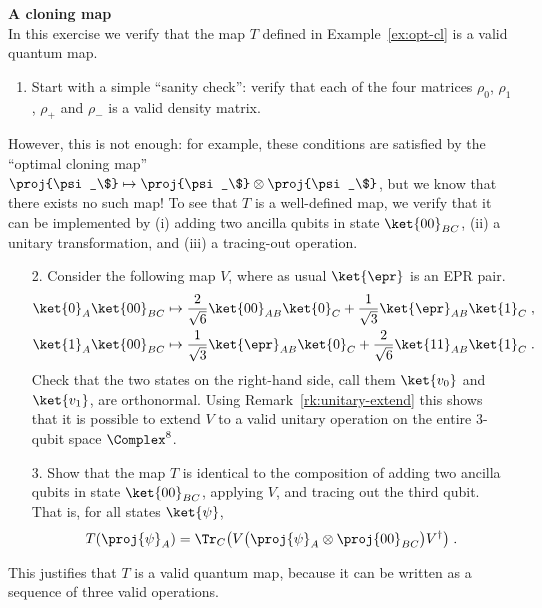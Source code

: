 \begin{exercises}
\item {\bf A cloning map}\label{ex:2-qmamp}\\
In this exercise we verify that the map $T$ defined in Example~\ref{ex:opt-cl} is a valid quantum map. 
\begin{enumerate}
\item Start with a simple ``sanity check'': verify that each of the four matrices $\rho_0$, $\rho_1$, $\rho_+$ and $\rho_-$ is a valid density matrix. 
\end{enumerate}
However, this is not enough: for example, these conditions are satisfied by the ``optimal cloning map'' $\proj{\psi_\$}\mapsto \proj{\psi_\$}\otimes \proj{\psi_\$}$, but we know that there exists no such map! To see that $T$ is a well-defined map, we verify that it can be implemented by (i) adding two ancilla qubits in state $\ket{00}_{BC}$, (ii) a unitary transformation, and (iii) a tracing-out operation. 
\begin{enumerate}
\item[2.] Consider the following map $V$, where as usual $\ket{\epr}$ is an EPR pair.  
\begin{align*}
\ket{0}_A \ket{00}_{BC} \mapsto \frac{2}{\sqrt{6}}\ket{00}_{AB}\ket{0}_C + \frac{1}{\sqrt{3}} \ket{\epr}_{AB} \ket{1}_C \;,\\
\ket{1}_A \ket{00}_{BC} \mapsto  \frac{1}{\sqrt{3}} \ket{\epr}_{AB}\ket{0}_C + \frac{2}{\sqrt{6}}\ket{11}_{AB}\ket{1}_C \;.
\end{align*}
Check that  the two states on the right-hand side, call them $\ket{v_0}$ and $\ket{v_1}$, are orthonormal. Using Remark~\ref{rk:unitary-extend} this shows that it is possible to extend $V$ to a valid unitary operation on the entire $3$-qubit space $\Complex^8$. 
\item[3.] Show that the map $T$ is identical to the composition of adding two ancilla qubits in state $\ket{00}_{BC}$, applying $V$, and tracing out the third qubit. That is, for all states $\ket{\psi}$,
\[T(\proj{\psi}_A) = \Tr_C \big( V\big( \proj{\psi}_A \otimes \proj{00}_{BC} \big) V^\dagger \big) \;.\]
\end{enumerate}
This justifies that $T$ is a valid quantum map, because it can be written as a sequence of three valid operations.



\end{exercises}
